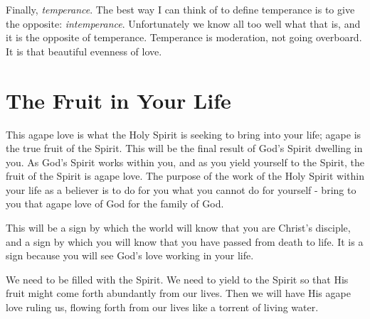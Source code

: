 Finally, \emph{temperance}. The best way I can think of to define temperance is to give the opposite: \emph{intemperance}. Unfortunately we know all too well what that is, and it is the opposite of temperance. Temperance is moderation, not going overboard. It is that beautiful evenness of love. 

\section*{The Fruit in Your Life}

This agape love is what the Holy Spirit is seeking to bring into your life; agape is the true fruit of the Spirit. This will be the final result of God's Spirit dwelling in you. As God's Spirit works within you, and as you yield yourself to the Spirit, the fruit of the Spirit is agape love. The purpose of the work of the Holy Spirit within your life as a believer is to do for you what you cannot do for yourself - bring to you that agape love of God for the family of God. 

This will be a sign by which the world will know that you are Christ's disciple, and a sign by which you will know that you have passed from death to life. It is a sign because you will see God's love working in your life. 

We need to be filled with the Spirit. We need to yield to the Spirit so that His fruit might come forth abundantly from our lives. Then we will have His agape love ruling us, flowing forth from our lives like a torrent of living water. 


